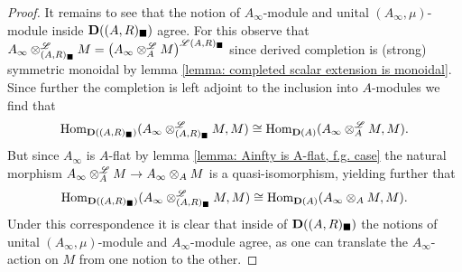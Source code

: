 \begin{proof}
	It remains to see that the notion of $A_\infty$-module and unital $(A_\infty, \mu)$-module inside ${{\mathbf{D}}((A, R)_\blacksquare)}$ agree. For this observe that $A_\infty\Dotimes_{(A, R)_\blacksquare} M = \derivedCompletion{A_\infty\Dotimes_A M}{(A, R)_\blacksquare}$ since derived completion is (strong) symmetric monoidal by lemma \ref{lemma: completed scalar extension is monoidal}. Since further the completion is left adjoint to the inclusion into $A$-modules we find that
	$${\operatorname{Hom}}_{{\mathbf{D}}((A, R)_\blacksquare)}(A_\infty\otimes^{\mathscr{L}}_{(A, R)_\blacksquare} M, M) \cong {\operatorname{Hom}}_{{\mathbf{D}}(A)}(A_\infty\otimes^{\mathscr{L}}_A M, M).$$
	But since $A_\infty$ is $A$-flat by lemma \ref{lemma: Ainfty is A-flat, f.g. case} the natural morphism $A_\infty\otimes^{\mathscr{L}}_A M \to A_\infty\otimes_A M$ is a quasi-isomorphism, yielding further that
	$${\operatorname{Hom}}_{{\mathbf{D}}((A, R)_\blacksquare)}(A_\infty\otimes^{\mathscr{L}}_{(A, R)_\blacksquare} M, M) \cong {\operatorname{Hom}}_{{\mathbf{D}}(A)}(A_\infty \otimes_A M, M).$$
	Under this correspondence it is clear that inside of ${{\mathbf{D}}((A, R)_\blacksquare)}$ the notions of unital $(A_\infty, \mu)$-module and $A_\infty$-module agree, as one can translate the $A_\infty$-action on $M$ from one notion to the other.
	

\end{proof}
